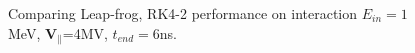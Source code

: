 \documentclass[a4paper,oneside,12pt]{report}
\numberwithin{equation}{chapter}
\begin{document}
\begin{figure}[H]
    \centering
    \vspace{20pt}
    \vspace{20pt}
    \caption{\centering Comparing Leap-frog, RK4-2 performance on \eE interaction $E_{in}=1$MeV, $\textbf{V}_{\parallel}$=4MV, $t_{end}=6$ns.} 
    \label{fig:lf_rk2_par_stat_E_comparison}
\end{figure}
\end{document}

